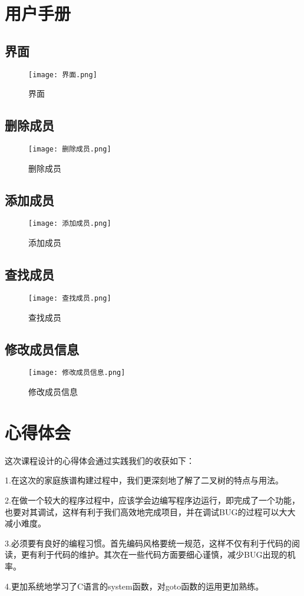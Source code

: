 \documentclass{DateStructure}
\begin{document}
\section{用户手册}
\subsection{界面}
\begin{figure}[H] 
\centering
\texttt{[image: 界面.png]}
\caption{界面}
\end{figure}
\subsection{删除成员}
\begin{figure}[H] 
\centering
\texttt{[image: 删除成员.png]}
\caption{删除成员}
\end{figure}
\subsection{添加成员}
\begin{figure}[H] 
\centering
\texttt{[image: 添加成员.png]}
\caption{添加成员}
\end{figure}
\subsection{查找成员}
\begin{figure}[H] 
\centering
\texttt{[image: 查找成员.png]}
\caption{查找成员}
\end{figure}
\subsection{修改成员信息}
\begin{figure}[H] 
\centering
\texttt{[image: 修改成员信息.png]}
\caption{修改成员信息}
\end{figure}


\section{心得体会}
这次课程设计的心得体会通过实践我们的收获如下：\par
1.在这次的家庭族谱构建过程中，我们更深刻地了解了二叉树的特点与用法。\par
2.在做一个较大的程序过程中，应该学会边编写程序边运行，即完成了一个功能，也要对其调试，这样有利于我们高效地完成项目，并在调试BUG的过程可以大大减小难度。\par
3.必须要有良好的编程习惯。首先编码风格要统一规范，这样不仅有利于代码的阅读，更有利于代码的维护。其次在一些代码方面要细心谨慎，减少BUG出现的机率。\par
4.更加系统地学习了C语言的system函数，对goto函数的运用更加熟练。\par
\end{document}
